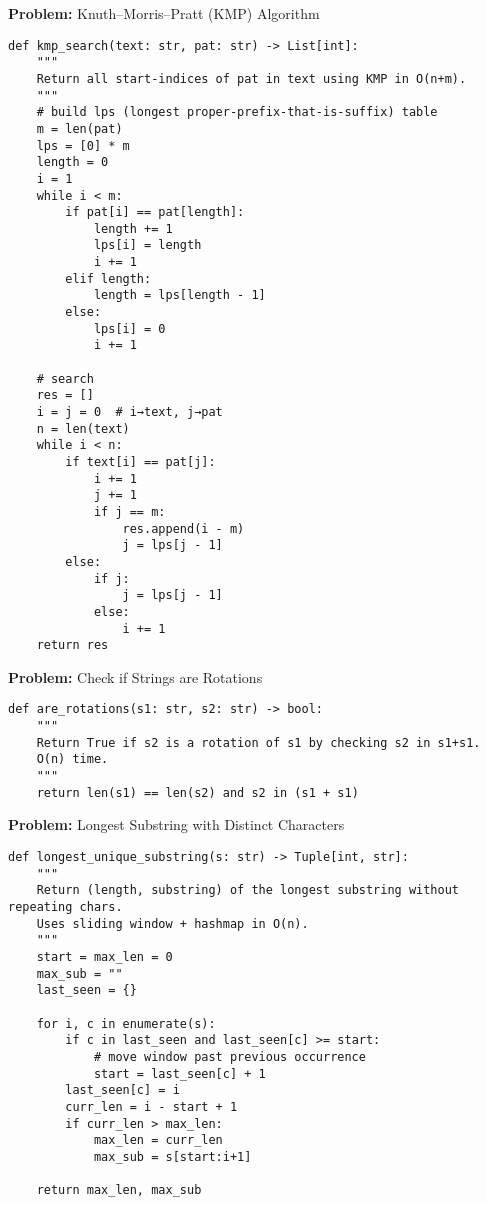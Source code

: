 \noindent\textbf{Problem:} Knuth–Morris–Pratt (KMP) Algorithm
\begin{verbatim}
def kmp_search(text: str, pat: str) -> List[int]:
    """
    Return all start-indices of pat in text using KMP in O(n+m).
    """
    # build lps (longest proper‐prefix‐that‐is‐suffix) table
    m = len(pat)
    lps = [0] * m
    length = 0
    i = 1
    while i < m:
        if pat[i] == pat[length]:
            length += 1
            lps[i] = length
            i += 1
        elif length:
            length = lps[length - 1]
        else:
            lps[i] = 0
            i += 1

    # search
    res = []
    i = j = 0  # i→text, j→pat
    n = len(text)
    while i < n:
        if text[i] == pat[j]:
            i += 1
            j += 1
            if j == m:
                res.append(i - m)
                j = lps[j - 1]
        else:
            if j:
                j = lps[j - 1]
            else:
                i += 1
    return res
\end{verbatim}
\noindent\textbf{Problem:} Check if Strings are Rotations
\begin{verbatim}
def are_rotations(s1: str, s2: str) -> bool:
    """
    Return True if s2 is a rotation of s1 by checking s2 in s1+s1.
    O(n) time.
    """
    return len(s1) == len(s2) and s2 in (s1 + s1)
\end{verbatim}
\noindent\textbf{Problem:} Longest Substring with Distinct Characters
\begin{verbatim}
def longest_unique_substring(s: str) -> Tuple[int, str]:
    """
    Return (length, substring) of the longest substring without repeating chars.
    Uses sliding window + hashmap in O(n).
    """
    start = max_len = 0
    max_sub = ""
    last_seen = {}

    for i, c in enumerate(s):
        if c in last_seen and last_seen[c] >= start:
            # move window past previous occurrence
            start = last_seen[c] + 1
        last_seen[c] = i
        curr_len = i - start + 1
        if curr_len > max_len:
            max_len = curr_len
            max_sub = s[start:i+1]

    return max_len, max_sub
\end{verbatim}
